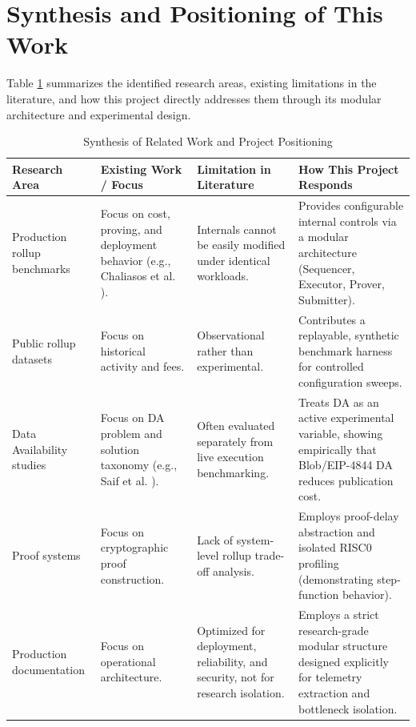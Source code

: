 \section{Synthesis and Positioning of This Work}
\label{sec:gap_analysis}

Table \ref{tab:literature_synthesis} summarizes the identified research areas, existing limitations in the literature, and how this project directly addresses them through its modular architecture and experimental design.

\begin{table}[H]
\centering
\caption{Synthesis of Related Work and Project Positioning}
\label{tab:literature_synthesis}
\small
\begin{tabularx}{\textwidth}{>{\hsize=0.7\hsize}X >{\hsize=1.1\hsize}X >{\hsize=1.1\hsize}X >{\hsize=1.1\hsize}X}
\toprule
\textbf{Research Area} & \textbf{Existing Work / Focus} & \textbf{Limitation in Literature} & \textbf{How This Project Responds} \\
\midrule
Production rollup benchmarks & Focus on cost, proving, and deployment behavior (e.g., Chaliasos et al. \citet{chaliasos2024analyzing}). & Internals cannot be easily modified under identical workloads. & Provides configurable internal controls via a modular architecture (Sequencer, Executor, Prover, Submitter). \\
\addlinespace
Public rollup datasets & Focus on historical activity and fees. & Observational rather than experimental. & Contributes a replayable, synthetic benchmark harness for controlled configuration sweeps. \\
\addlinespace
Data Availability studies & Focus on DA problem and solution taxonomy (e.g., Saif et al. \citet{saif2024dataavailability}). & Often evaluated separately from live execution benchmarking. & Treats DA as an active experimental variable, showing empirically that Blob/EIP-4844 DA reduces publication cost. \\
\addlinespace
Proof systems & Focus on cryptographic proof construction. & Lack of system-level rollup trade-off analysis. & Employs proof-delay abstraction and isolated RISC0 profiling (demonstrating step-function behavior). \\
\addlinespace
Production documentation & Focus on operational architecture. & Optimized for deployment, reliability, and security, not for research isolation. & Employs a strict research-grade modular structure designed explicitly for telemetry extraction and bottleneck isolation. \\
\bottomrule
\end{tabularx}
\end{table}

